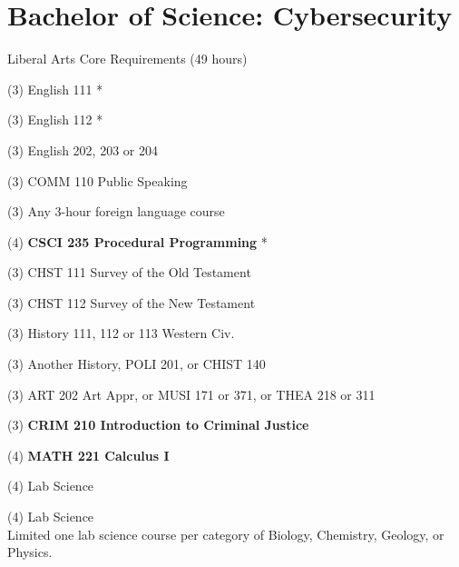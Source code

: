 %
\section*{Bachelor of Science: Cybersecurity}

\begin{reqgroup}{Liberal Arts Core Requirements (49 hours)}
\begin{checklist}
\begin{minipage}[t]{0.5\linewidth}
	\item (3) English 111 *
	\item (3) English 112 *
	\item (3) English 202, 203 or 204
	\item (3) COMM 110 Public Speaking
	\item (3) Any 3-hour foreign language course
	\item (4) \textbf{CSCI 235  Procedural Programming} *
	\item (3) CHST 111  Survey of the Old Testament
	\item (3) CHST 112  Survey of the New Testament
	\item (3) History 111, 112 or 113 Western Civ.
\end{minipage}
\begin{minipage}[t]{0.5\linewidth}
	\item (3)	Another History, POLI 201, or CHIST 140
	\item (3)	ART 202 Art Appr, or MUSI 171 or 371, or THEA 218 or 311
	\item (3)	\textbf{CRIM 210 Introduction to Criminal Justice}
	\item (4)	\textbf{MATH 221 Calculus I}
	\item (4)	 Lab Science
	\item (4)	 Lab Science\\Limited one lab science course per category of Biology, Chemistry,
Geology, or Physics.
\end{minipage}
\end{checklist}
\end{reqgroup}


